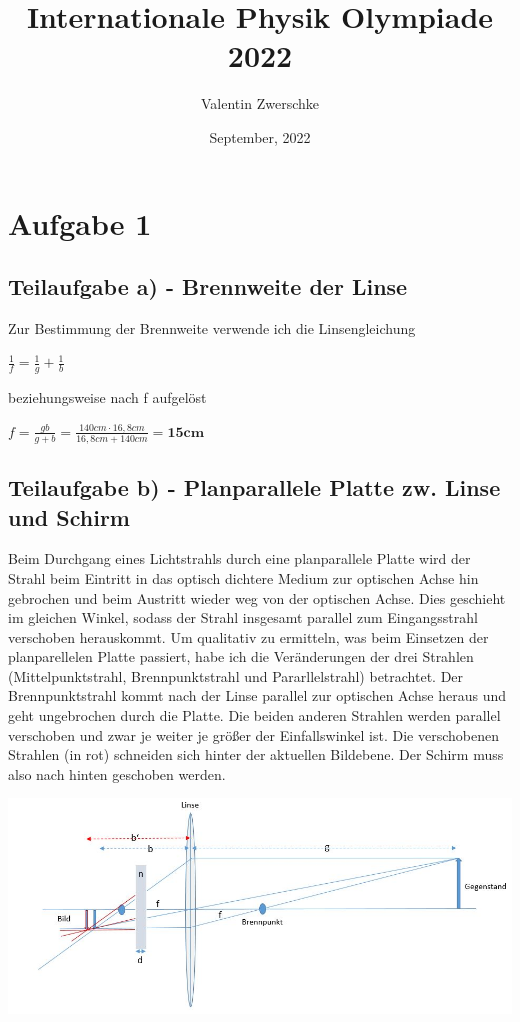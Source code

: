\documentclass{article}
\title{Internationale Physik Olympiade 2022}
\author{Valentin Zwerschke}
\date{September, 2022}
\begin{document}
\maketitle
\section*{Aufgabe 1}
\subsection*{Teilaufgabe a) - Brennweite der Linse}
Zur Bestimmung der Brennweite verwende ich die Linsengleichung
\begin{center}
	$\frac{1}{f}=\frac{1}{g}+\frac{1}{b}$
\end{center}
beziehungsweise nach f aufgelöst
\begin{center}
	$f=\frac{gb}{g+b}=\frac{140cm\cdot16,8cm}{16,8cm+140cm}=\textbf{15cm}$
\end{center}
\subsection*{Teilaufgabe b) - Planparallele Platte zw. Linse und Schirm}
Beim Durchgang eines Lichtstrahls durch eine planparallele Platte wird der Strahl beim Eintritt in das optisch dichtere
Medium zur optischen Achse hin gebrochen und beim Austritt wieder weg von der optischen Achse. Dies geschieht im gleichen Winkel, 
sodass der Strahl insgesamt parallel zum Eingangsstrahl verschoben herauskommt.   
Um qualitativ zu ermitteln, was beim Einsetzen der planparellelen Platte passiert, habe ich die Veränderungen der drei Strahlen (Mittelpunktstrahl, Brennpunktstrahl und Pararllelstrahl) betrachtet.
Der Brennpunktstrahl kommt nach der Linse parallel zur optischen Achse heraus und geht ungebrochen durch die Platte. Die beiden anderen Strahlen werden parallel verschoben und zwar je weiter je größer der Einfallswinkel ist. 
Die verschobenen Strahlen (in rot) schneiden sich hinter der aktuellen Bildebene. Der Schirm muss also nach hinten geschoben werden.
\begin{center}
	\includegraphics[scale=0.45]{Linse.JPG}
\end{center}
\end{document}
